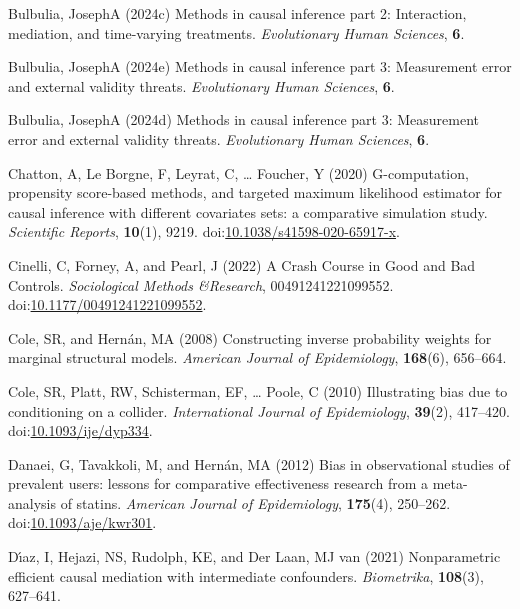\documentclass[
  single column]{article}
\newlength{\cslhangindent}
\newenvironment{CSLReferences}[2] %
 {\begin{list}{}{%
  \setlength{\itemindent}{0pt}
  \setlength{\leftmargin}{0pt}
  \setlength{\parsep}{0pt}
  \ifodd #1
   \setlength{\leftmargin}{\cslhangindent}
   \setlength{\itemindent}{-1\cslhangindent}
  \fi
  \setlength{\itemsep}{#2\baselineskip}}}
 {\end{list}}
\begin{document}
\begin{CSLReferences}{1}{0}
Bulbulia, JosephA (2024c) Methods in causal inference part 2:
Interaction, mediation, and time-varying treatments. \emph{Evolutionary
Human Sciences}, \textbf{6}.

Bulbulia, JosephA (2024e) Methods in causal inference part 3:
Measurement error and external validity threats. \emph{Evolutionary
Human Sciences}, \textbf{6}.

Bulbulia, JosephA (2024d) Methods in causal inference part 3:
Measurement error and external validity threats. \emph{Evolutionary
Human Sciences}, \textbf{6}.

Chatton, A, Le Borgne, F, Leyrat, C, \ldots{} Foucher, Y (2020)
G-computation, propensity score-based methods, and targeted maximum
likelihood estimator for causal inference with different covariates
sets: a comparative simulation study. \emph{Scientific Reports},
\textbf{10}(1), 9219.
doi:\href{https://doi.org/10.1038/s41598-020-65917-x}{10.1038/s41598-020-65917-x}.

Cinelli, C, Forney, A, and Pearl, J (2022) A Crash Course in Good and
Bad Controls. \emph{Sociological Methods \&Research}, 00491241221099552.
doi:\href{https://doi.org/10.1177/00491241221099552}{10.1177/00491241221099552}.

Cole, SR, and Hernán, MA (2008) Constructing inverse probability weights
for marginal structural models. \emph{American Journal of Epidemiology},
\textbf{168}(6), 656--664.

Cole, SR, Platt, RW, Schisterman, EF, \ldots{} Poole, C (2010)
Illustrating bias due to conditioning on a collider. \emph{International
Journal of Epidemiology}, \textbf{39}(2), 417--420.
doi:\href{https://doi.org/10.1093/ije/dyp334}{10.1093/ije/dyp334}.

Danaei, G, Tavakkoli, M, and Hernán, MA (2012) Bias in observational
studies of prevalent users: lessons for comparative effectiveness
research from a meta-analysis of statins. \emph{American Journal of
Epidemiology}, \textbf{175}(4), 250--262.
doi:\href{https://doi.org/10.1093/aje/kwr301}{10.1093/aje/kwr301}.

Dı́az, I, Hejazi, NS, Rudolph, KE, and Der Laan, MJ van (2021)
Nonparametric efficient causal mediation with intermediate confounders.
\emph{Biometrika}, \textbf{108}(3), 627--641.


\end{CSLReferences}
\end{document}
